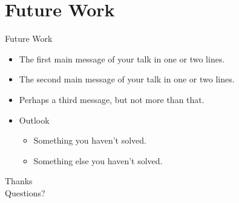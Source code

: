 \documentclass{beamer}
\begin{document}
\section{Future Work}
\begin{frame}{Future Work}
  \begin{itemize}
  \item
    The \alert{first main message} of your talk in one or two lines.
  \item
    The \alert{second main message} of your talk in one or two lines.
  \item
    Perhaps a \alert{third message}, but not more than that.
  \end{itemize}
  
  \begin{itemize}
  \item
    Outlook
    \begin{itemize}
    \item
      Something you haven't solved.
    \item
      Something else you haven't solved.
    \end{itemize}
  \end{itemize}
\end{frame}



\begin{frame}
\begin{center}
\Huge{Thanks}\\


\LARGE{Questions?}
\end{center}
\end{frame}
\end{document}
